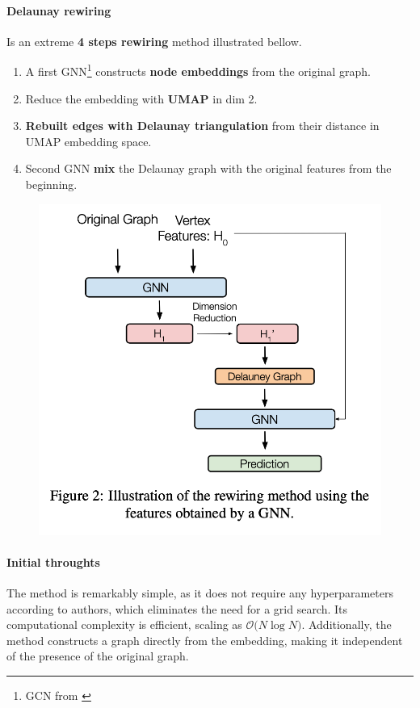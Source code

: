 \documentclass{article}
\theoremstyle{plain}
\theoremstyle{definition}
\theoremstyle{remark}
\begin{document}
\paragraph{Delaunay rewiring}
Is an extreme \textbf{4 steps rewiring} method illustrated bellow.
\begin{enumerate}
    \item A first GNN\footnote{GCN from \cite{kipf2017semi}} constructs 
        \textbf{node embeddings} from the original graph.
    \item Reduce the embedding with \textbf{UMAP} in dim 2.
    \item \textbf{Rebuilt edges with Delaunay triangulation} from their distance in UMAP embedding space.
    \item Second GNN \textbf{mix} the Delaunay graph with the original features 
    from the beginning.
\end{enumerate}
\begin{figure}[ht!]
    \begin{center}
    \label{fig:delaunay_rewiring}
    \vskip -0.2in
    \includegraphics[width=0.9\columnwidth]{figures/Rewiring_method.png}
    \vskip -0.2in
    \end{center}
    \end{figure}

\paragraph{Initial throughts}
The method is remarkably simple, as it does not require any hyperparameters according to authors, 
which eliminates the need for a grid search. Its computational complexity is 
efficient, scaling as $\mathcal{O} \big( N \log N \big)$. 
Additionally, the method constructs a graph directly from the embedding, 
making it independent of the presence of the original graph.
\end{document}
